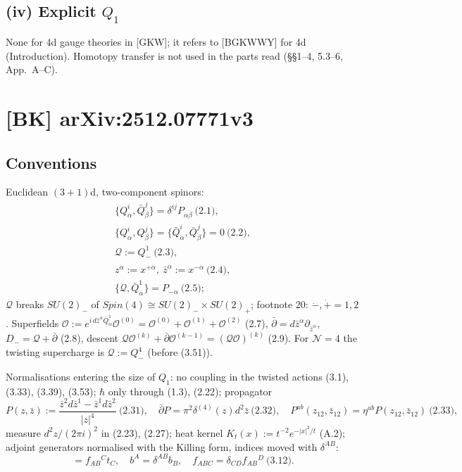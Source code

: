 \documentclass[10pt]{article}
\begin{document}
\subsection{(iv) Explicit $Q_1$}
None for 4d gauge theories in [GKW]; it refers to [BGKWWY] for 4d (Introduction). Homotopy transfer is not used in the parts read (\S\S1--4, 5.3--6, App.~A--C).

\section{[BK] arXiv:2512.07771v3}
\subsection{Conventions}
Euclidean $(3+1)$d, two-component spinors:
\begin{gather*}
\{Q^i_\alpha,\bar Q^j_{\dot\beta}\}=\delta^{ij}P_{\alpha\dot\beta}\ \text{(2.1)},\\
\{Q^i_\alpha,Q^j_\beta\}=\{\bar Q^i_{\dot\alpha},\bar Q^j_{\dot\beta}\}=0\ \text{(2.2)},\\
\mathcal Q:=Q^1_-\ \text{(2.3)},\\
z^{\dot\alpha}:=x^{+\dot\alpha},\ \bar z^{\dot\alpha}:=x^{-\dot\alpha}\ \text{(2.4)},\\
\{\mathcal Q,\bar Q^1_{\dot\alpha}\}=P_{-\dot\alpha}\ \text{(2.5)};
\end{gather*}
$\mathcal Q$ breaks $SU(2)_-$ of $Spin(4)\cong SU(2)_-\times SU(2)_+$; footnote 20: $\dot-,\dot+=1,2$. Superfields $\mathcal O:=e^{i\,d\bar z^{\dot\alpha}\bar Q^1_{\dot\alpha}}\mathcal O^{(0)}=\mathcal O^{(0)}+\mathcal O^{(1)}+\mathcal O^{(2)}$ (2.7), $\bar\partial=d\bar z^{\dot\alpha}\partial_{\bar z^{\dot\alpha}}$, $D_-=\mathcal Q+\bar\partial$ (2.8), descent $\mathcal Q\mathcal O^{(k)}+\bar\partial\mathcal O^{(k-1)}=(\mathcal Q\mathcal O)^{(k)}$ (2.9). For $\mathcal N=4$ the twisting supercharge is $\mathcal Q:=Q^4_-$ (before (3.51)).

Normalisations entering the size of $Q_1$: no coupling in the twisted actions (3.1), (3.33), (3.39), (3.53); $\hbar$ only through (1.3), (2.22); propagator
\begin{equation*}
P(z,\bar z):=\frac{\bar z^2d\bar z^1-\bar z^1d\bar z^2}{|z|^4}\ \text{(2.31)},\quad \bar\partial P=\pi^2\delta^{(4)}(z)d^2\bar z\ \text{(2.32)},\quad P^{ab}(z_{12},\bar z_{12})=\eta^{ab}P(z_{12},\bar z_{12})\ \text{(2.33)},
\end{equation*}
measure $d^2z/(2\pi i)^2$ in (2.23), (2.27); heat kernel $K_t(x):=t^{-2}e^{-|x|^2/t}$ (A.2); adjoint generators normalised with the Killing form, indices moved with $\delta^{AB}$:
\begin{equation*}
[t_A,t_B]=f_{AB}{}^Ct_C,\quad b^A=\delta^{AB}b_B,\quad f_{ABC}=\delta_{CD}f_{AB}{}^D\ \text{(3.12)}.
\end{equation*}
\end{document}

